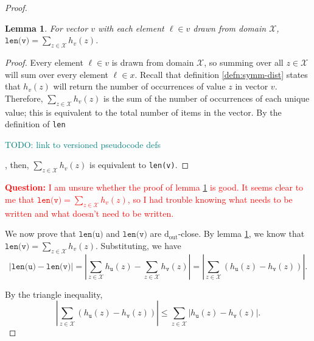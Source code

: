 \documentclass[12pt,letterpaper]{article}
\newcommand{\dout}{\mathrm{d_{out}}}
\newcommand{\question}[1]{\textcolor{red}{\textbf{Question:} #1}}
\newcommand{\todo}[1]{{\begin{center} \textcolor{teal}{{\huge TODO:} #1}\end{center}}}
\newtheorem{lemma}[theorem]{Lemma}
\theoremstyle{definition}
\begin{document}
\begin{proof}
\begin{lemma}
\label{lemma:len-sum-equiv}
For vector $v$ with each element $\ell\in v$ drawn from domain $\mathcal{X}$, $\texttt{len(v)} = \sum_{z\in\mathcal{X}} h_v(z)$.
\end{lemma}

\begin{proof}



Every element $\ell \in v$ is drawn from domain $\mathcal{X}$, so summing over all $z\in \mathcal{X}$ will sum over every element $\ell\in x$. Recall that definition \ref{defn:symm-dist} states that $h_v(z)$ will return the number of occurrences of value $z$ in vector $v$. Therefore,  $\sum_{z\in\mathcal{X}} h_v(z)$ is the sum of the number of occurrences of each unique value; this is equivalent to the total number of items in the vector. By the definition of \texttt{len}
\todo{link to versioned pseudocode defs}
, then, $\sum_{z\in\mathcal{X}} h_v(z)$ is equivalent to \texttt{len(v)}.

\end{proof}

\question{I am unsure whether the proof of lemma \ref{lemma:len-sum-equiv} is good. It seems clear to me that $\texttt{len(v)} = \sum_{z\in\mathcal{X}} h_v(z)$, so I had trouble knowing what needs to be written and what doesn't need to be written.}

We now prove that $\texttt{len(u)}$ and $\texttt{len(v)}$ are $\dout$-close. By lemma \ref{lemma:len-sum-equiv}, we know that $\texttt{len(v)} = \sum_{z\in\mathcal{X}} h_v(z)$. Substituting, we have
\begin{equation}
\label{eq:len-sum}
    |\texttt{len(u)} - \texttt{len(v)}|
    =
    |\sum_{z\in \mathcal{X}} h_{\texttt{u}}(z) - \sum_{z\in \mathcal{X}} h_{\texttt{v}}(z)|
    =
    |\sum_{z\in \mathcal{X}}\left(h_{\texttt{u}}(z) - h_{\texttt{v}}(z)\right)|.
\end{equation}

By the triangle inequality,
\begin{equation}
\label{ineq:sum-ineq}
    |\sum_{z\in \mathcal{X}}\left(h_{\texttt{u}}(z) - h_{\texttt{v}}(z)\right)|
    \leq 
    \sum_{z\in \mathcal{X}}|h_{\texttt{u}}(z) - h_{\texttt{v}}(z)|.
\end{equation}


\end{proof}
\end{document}
